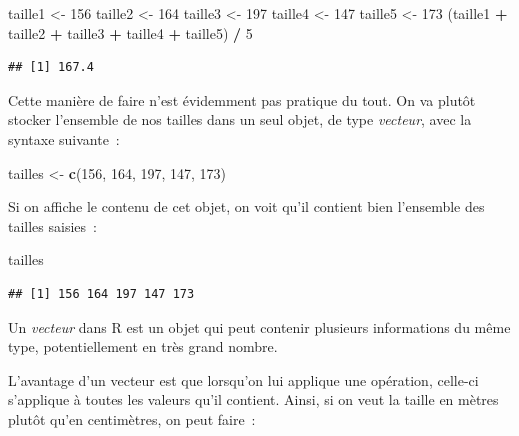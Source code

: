 \documentclass[12pt,]{book}
\newenvironment{Shaded}{\begin{snugshade}}{\end{snugshade}}
\newcommand{\DecValTok}[1]{\textcolor[rgb]{0.00,0.00,0.81}{#1}}
\newcommand{\KeywordTok}[1]{\textcolor[rgb]{0.13,0.29,0.53}{\textbf{#1}}}
\newcommand{\NormalTok}[1]{#1}
\newcommand{\OperatorTok}[1]{\textcolor[rgb]{0.81,0.36,0.00}{\textbf{#1}}}
\newcommand{\StringTok}[1]{\textcolor[rgb]{0.31,0.60,0.02}{#1}}
\begin{document}
\begin{Shaded}
\begin{Highlighting}[]
\NormalTok{taille1 <-}\StringTok{ }\DecValTok{156}
\NormalTok{taille2 <-}\StringTok{ }\DecValTok{164}
\NormalTok{taille3 <-}\StringTok{ }\DecValTok{197}
\NormalTok{taille4 <-}\StringTok{ }\DecValTok{147}
\NormalTok{taille5 <-}\StringTok{ }\DecValTok{173}
\NormalTok{(taille1 }\OperatorTok{+}\StringTok{ }\NormalTok{taille2 }\OperatorTok{+}\StringTok{ }\NormalTok{taille3 }\OperatorTok{+}\StringTok{ }\NormalTok{taille4 }\OperatorTok{+}\StringTok{ }\NormalTok{taille5) }\OperatorTok{/}\StringTok{ }\DecValTok{5}
\end{Highlighting}
\end{Shaded}

\begin{verbatim}
## [1] 167.4
\end{verbatim}

Cette manière de faire n'est évidemment pas pratique du tout. On va plutôt stocker l'ensemble de nos tailles dans un seul objet, de type \emph{vecteur}, avec la syntaxe suivante~:

\begin{Shaded}
\begin{Highlighting}[]
\NormalTok{tailles <-}\StringTok{ }\KeywordTok{c}\NormalTok{(}\DecValTok{156}\NormalTok{, }\DecValTok{164}\NormalTok{, }\DecValTok{197}\NormalTok{, }\DecValTok{147}\NormalTok{, }\DecValTok{173}\NormalTok{)}
\end{Highlighting}
\end{Shaded}

Si on affiche le contenu de cet objet, on voit qu'il contient bien l'ensemble des tailles saisies~:

\begin{Shaded}
\begin{Highlighting}[]
\NormalTok{tailles}
\end{Highlighting}
\end{Shaded}

\begin{verbatim}
## [1] 156 164 197 147 173
\end{verbatim}

Un \emph{vecteur} dans R est un objet qui peut contenir plusieurs informations du même type, potentiellement en très grand nombre.

L'avantage d'un vecteur est que lorsqu'on lui applique une opération, celle-ci s'applique à toutes les valeurs qu'il contient. Ainsi, si on veut la taille en mètres plutôt qu'en centimètres, on peut faire~:
\end{document}
